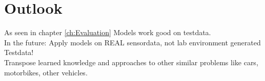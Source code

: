 \chapter{Outlook}

As seen in chapter \ref{ch:Evaluation} 
Models work good on testdata.
\\
In the future: Apply models on REAL sensordata, not lab environment generated Testdata!
\\
Transpose learned knowledge and approaches to other similar problems like cars, motorbikes, other vehicles.
